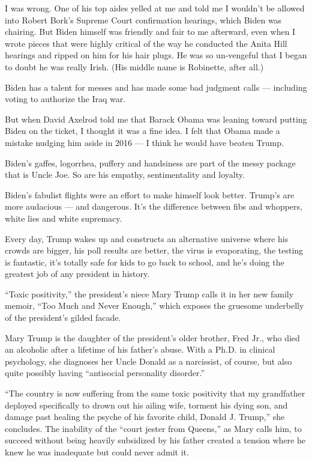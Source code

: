 I was wrong. One of his top aides yelled at me and told me I wouldn't be
allowed into Robert Bork's Supreme Court confirmation hearings, which
Biden was chairing. But Biden himself was friendly and fair to me
afterward, even when I wrote pieces that were highly critical of the way
he conducted the Anita Hill hearings and ripped on him for his hair
plugs. He was so un-vengeful that I began to doubt he was really Irish.
(His middle name is Robinette, after all.)

Biden has a talent for messes and has made some bad judgment calls ---
including voting to authorize the Iraq war.

But when David Axelrod told me that Barack Obama was leaning toward
putting Biden on the ticket, I thought it was a fine idea. I felt that
Obama made a mistake nudging him aside in 2016 --- I think he would have
beaten Trump.

Biden's gaffes, logorrhea, puffery and handsiness are part of the messy
package that is Uncle Joe. So are his empathy, sentimentality and
loyalty.

Biden's fabulist flights were an effort to make himself look better.
Trump's are more audacious --- and dangerous. It's the difference
between fibs and whoppers, white lies and white supremacy.

Every day, Trump wakes up and constructs an alternative universe where
his crowds are bigger, his poll results are better, the virus is
evaporating, the testing is fantastic, it's totally safe for kids to go
back to school, and he's doing the greatest job of any president in
history.

``Toxic positivity,'' the president's niece Mary Trump calls it in her
new family memoir, ``Too Much and Never Enough,'' which exposes the
gruesome underbelly of the president's gilded facade.

Mary Trump is the daughter of the president's older brother, Fred Jr.,
who died an alcoholic after a lifetime of his father's abuse. With a
Ph.D. in clinical psychology, she diagnoses her Uncle Donald as a
narcissist, of course, but also quite possibly having ``antisocial
personality disorder.''

``The country is now suffering from the same toxic positivity that my
grandfather deployed specifically to drown out his ailing wife, torment
his dying son, and damage past healing the psyche of his favorite child,
Donald J. Trump,'' she concludes. The inability of the ``court jester
from Queens,'' as Mary calls him, to succeed without being heavily
subsidized by his father created a tension where he knew he was
inadequate but could never admit it.

